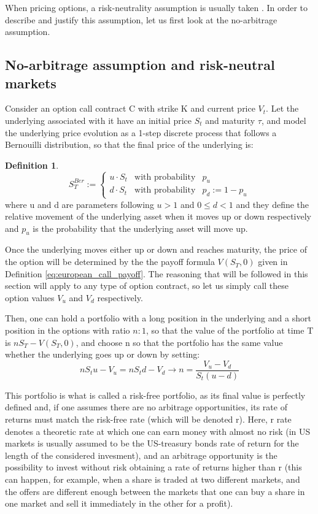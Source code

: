 \documentclass[12,twoside]{mammeTFM}
\theoremstyle{definition}
\newtheorem{definition}[thm]{Definition}
\theoremstyle{remark}
\begin{document}
When pricing options, a risk-neutrality assumption is usually taken \cite{hul09}. In order to describe and justify this assumption, let us first look at the no-arbitrage assumption.

\subsection{No-arbitrage assumption and risk-neutral markets}\label{subsec:riks_neutral}

Consider an option call contract C with strike K and current price $V_t$. Let the underlying associated with it have an initial price $S_t$ and maturity $\tau$, and model the underlying price evolution as a 1-step discrete process that follows a Bernouilli distribution, so that the final price of the underlying is:
\begin{definition}
\begin{equation}
S_T^{Ber} := \left\{ \begin{array}{rcl} u \cdot S_t & \mbox{with probability} & p_u \\
 d \cdot S_t & \mbox{with probability} & p_d := 1 -p_u \end{array}\right.
\end{equation}
where u and d are parameters following $u > 1$ and $0 \leq d < 1$ and they define the relative movement of the underlying asset when it moves up or down respectively and $p_u$ is the probability that the underlying asset will move up.
\end{definition}

Once the underlying moves either up or down and reaches maturity, the price of the option will be determined by the the payoff formula $V(S_T, 0)$ given in Definition \ref{eq:european_call_payoff}. The reasoning that will be followed in this section will apply to any type of option contract, so let us simply call these option values $V_u$ and $V_d$ respectively.

Then, one can hold a portfolio with a long position in the underlying and a short position in the options with ratio $n:1$, so that the value of the portfolio at time T is $n S_T - V(S_T, 0)$, and choose n so that the portfolio has the same value whether the underlying goes up or down by setting:
\begin{equation}
n S_t u - V_u = n S_t d - V_d \rightarrow n = \dfrac{V_u - V_d}{S_t(u - d)}
\end{equation}

This portfolio is what is called a risk-free portfolio, as its final value is perfectly defined and, if one assumes there are no arbitrage opportunities, its rate of returns must match the risk-free rate (which will be denoted r). Here, r rate denotes a theoretic rate at which one can earn money with almost no risk (in US markets is usually assumed to be the US-treasury bonds rate of return for the length of the considered invesment), and an arbitrage opportunity is the possibility to invest without risk obtaining a rate of returns higher than r (this can happen, for example, when a share is traded at two different markets, and the offers are different enough between the markets that one can buy a share in one market and sell it immediately in the other for a profit).
\end{document}
